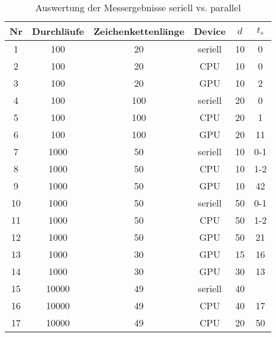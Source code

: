 \begin{table}[!h]
     \centering
    \begin{tabular}{cccccc}
      Nr & Durchläufe & Zeichenkettenlänge & Device & $d$ & $t_s$ \\
        \hline                                                     \hline
        1 & 100 & 20 & seriell  & 10 & 0 \\
        2 & 100 & 20 & CPU      & 10 & 0 \\
        3 & 100 & 20 & GPU      & 10 & 2 \\
        \hline
        4 & 100 & 100 & seriell  & 20 & 0  \\
        5 & 100 & 100 & CPU      & 20 & 1  \\
        6 & 100 & 100 & GPU      & 20 & 11 \\
        \hline
        7 & 1000 & 50 & seriell  & 10 & 0-1  \\
        8 & 1000 & 50 & CPU      & 10 & 1-2 \\
        9 & 1000 & 50 & GPU      & 10 & 42 \\
        \hline
        10 & 1000 & 50 & seriell  & 50 & 0-1 \\
        11 & 1000 & 50 & CPU      & 50 & 1-2 \\
        12 & 1000 & 50 & GPU      & 50 & 21 \\
        \hline
        13 & 1000 & 30 & GPU      & 15 & 16 \\
        14 & 1000 & 30 & GPU      & 30 & 13 \\
        \hline
        15 & 10000 & 49 & seriell & 40  \\
        16 & 10000 & 49 & CPU & 40 & 17 \\
        17 & 10000 & 49 & CPU & 20 & 50 \\


        \hline
    \end{tabular}
    \caption{Auswertung der Messergebnisse seriell vs. parallel}
    \label{tbl:results}
\end{table}
